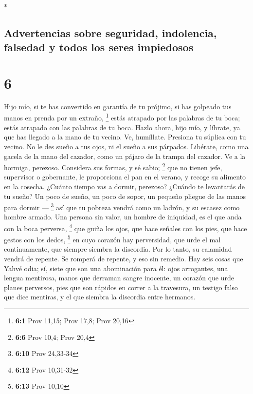 \begin{paracol}{2}
\switchcolumn[0]*

\hypertarget{advertencias-sobre-seguridad-indolencia-falsedad-y-todos-los-seres-impiedosos}{%
\subsection{Advertencias sobre seguridad, indolencia, falsedad y todos
los seres
impiedosos}\label{advertencias-sobre-seguridad-indolencia-falsedad-y-todos-los-seres-impiedosos}}

\hypertarget{section-10}{%
\section{6}\label{section-10}}

 Hijo mío, si te has convertido en garantía de tu prójimo,
si has golpeado tus manos en prenda por un extraño, \footnote{\textbf{6:1}
  Prov 11,15; Prov 17,8; Prov 20,16}  estás atrapado por
las palabras de tu boca; estás atrapado con las palabras de tu boca.
 Hazlo ahora, hijo mío, y líbrate, ya que has llegado a la
mano de tu vecino. Ve, humíllate. Presiona tu súplica con tu vecino.
 No le des sueño a tus ojos, ni el sueño a sus párpados.
 Libérate, como una gacela de la mano del cazador, como un
pájaro de la trampa del cazador.  Ve a la hormiga,
perezoso. Considera sus formas, y sé sabio; \footnote{\textbf{6:6} Prov
  10,4; Prov 20,4}  que no tienen jefe, supervisor o
gobernante,  le proporciona el pan en el verano, y recoge
su alimento en la cosecha.  ¿Cuánto tiempo vas a dormir,
perezoso? ¿Cuándo te levantarás de tu sueño?  Un poco de
sueño, un poco de sopor, un pequeño pliegue de las manos para dormir ---
\footnote{\textbf{6:10} Prov 24,33-34}  así que tu
pobreza vendrá como un ladrón, y su escasez como hombre armado.
 Una persona sin valor, un hombre de iniquidad, es el que
anda con la boca perversa, \footnote{\textbf{6:12} Prov 10,31-32}
 que guiña los ojos, que hace señales con los pies, que
hace gestos con los dedos, \footnote{\textbf{6:13} Prov 10,10}
 en cuyo corazón hay perversidad, que urde el mal
continuamente, que siempre siembra la discordia.  Por lo
tanto, su calamidad vendrá de repente. Se romperá de repente, y eso sin
remedio.  Hay seis cosas que Yahvé odia; sí, siete que
son una abominación para él:  ojos arrogantes, una lengua
mentirosa, manos que derraman sangre inocente,  un
corazón que urde planes perversos, pies que son rápidos en correr a la
travesura,  un testigo falso que dice mentiras, y el que
siembra la discordia entre hermanos.


\end{paracol}
